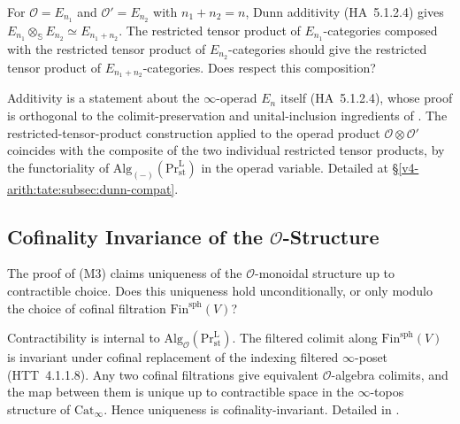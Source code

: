 \begin{obstruction}
For \(\mathcal{O}=E_{n_{1}}\) and \(\mathcal{O}'=E_{n_{2}}\) with
\(n_{1}+n_{2}=n\), Dunn additivity (HA~5.1.2.4) gives
\(E_{n_{1}}\otimes_{\mathbb{S}}E_{n_{2}}\simeq E_{n_{1}+n_{2}}\). The
restricted tensor product of \(E_{n_{1}}\)-categories composed with
the restricted tensor product of \(E_{n_{2}}\)-categories should give
the restricted tensor product of \(E_{n_{1}+n_{2}}\)-categories. Does
 respect this composition?
\end{obstruction}

\begin{correction}
Additivity is a statement about the \(\infty\)-operad
\(E_{n}\) itself (HA~5.1.2.4), whose proof is orthogonal to the
colimit-preservation and unital-inclusion ingredients of
. The restricted-tensor-product
construction applied to the operad product \(\mathcal{O}\otimes\mathcal{O}'\)
coincides with the composite of the two individual restricted tensor
products, by the functoriality of
\(\mathrm{Alg}_{(-)}(\mathrm{Pr}^{\mathrm{L}}_{\mathrm{st}})\) in the
operad variable. Detailed at
\S\ref{v4-arith:tate:subsec:dunn-compat}.
\end{correction}

\subsection{Cofinality Invariance of the \(\mathcal{O}\)-Structure}

\begin{obstruction}
The proof of (M3) claims uniqueness
of the \(\mathcal{O}\)-monoidal structure up to contractible choice.
Does this uniqueness hold unconditionally, or only modulo the choice
of cofinal filtration \(\mathrm{Fin}^{\mathrm{sph}}(V)\)?
\end{obstruction}

\begin{correction}
Contractibility is internal to
\(\mathrm{Alg}_{\mathcal{O}}(\mathrm{Pr}^{\mathrm{L}}_{\mathrm{st}})\).
The filtered colimit along \(\mathrm{Fin}^{\mathrm{sph}}(V)\) is
invariant under cofinal replacement of the indexing filtered
\(\infty\)-poset (HTT~4.1.1.8). Any two cofinal filtrations give
equivalent \(\mathcal{O}\)-algebra colimits, and the map between them
is unique up to contractible space in the \(\infty\)-topos structure
of \(\mathrm{Cat}_{\infty}\). Hence uniqueness is cofinality-invariant.
Detailed in .
\end{correction}

